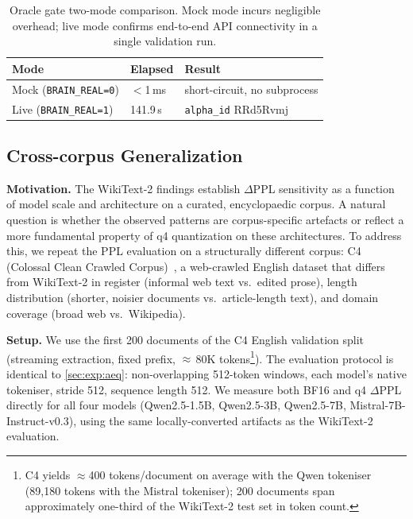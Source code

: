 \documentclass[10pt,twocolumn]{article}
\newcommand{\CCTOKENS}{80}             %
\begin{document}
\begin{table}[t]
  \centering
  \caption{Oracle gate two-mode comparison.  Mock mode incurs negligible overhead;
    live mode confirms end-to-end API connectivity in a single validation run.}
  \label{tab:oracle}
  \begin{tabular}{lll}
    \toprule
    Mode & Elapsed & Result \\
    \midrule
    Mock (\texttt{BRAIN\_REAL=0}) & $<$1\,ms & short-circuit, no subprocess \\
    Live (\texttt{BRAIN\_REAL=1}) & 141.9\,s & \texttt{alpha\_id} RRd5Rvmj \\
    \bottomrule
  \end{tabular}
\end{table}

\subsection{Cross-corpus Generalization}
\label{sec:exp:c4}

\textbf{Motivation.}  The WikiText-2 findings establish $\Delta$PPL sensitivity
as a function of model scale and architecture on a curated, encyclopaedic
corpus.  A natural question is whether the observed patterns are corpus-specific
artefacts or reflect a more fundamental property of q4 quantization on these
architectures.  To address this, we repeat the PPL evaluation on a structurally
different corpus: C4 (Colossal Clean Crawled Corpus)~\citep{raffel2020c4}, a
web-crawled English dataset that differs from WikiText-2 in register (informal
web text vs.\ edited prose), length distribution (shorter, noisier documents
vs.\ article-length text), and domain coverage (broad web vs.\ Wikipedia).

\textbf{Setup.}  We use the first 200 documents of the C4 English validation
split (streaming extraction, fixed prefix, $\approx$\,\CCTOKENS{}K
tokens\footnote{C4 yields $\approx$400 tokens/document on average with the
Qwen tokeniser (89,180 tokens with the Mistral tokeniser); 200 documents span
approximately one-third of the WikiText-2 test set in token count.}).  The
evaluation protocol is identical to \cref{sec:exp:aeq}: non-overlapping
512-token windows, each model's native tokeniser, stride 512, sequence
length 512.  We measure both BF16 and q4 $\Delta$PPL directly for all four
models (Qwen2.5-1.5B, Qwen2.5-3B, Qwen2.5-7B, Mistral-7B-Instruct-v0.3),
using the same locally-converted artifacts as the WikiText-2 evaluation.
\end{document}

